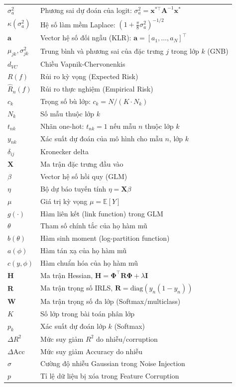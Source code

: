 \documentclass[oneside]{styles/hcmus-report}
\begin{document}
\begin{longtable}{p{} p{}}
$\sigma_a^2$            & Phương sai dự đoán của logit: $\sigma_a^2 = \mathbf{x}^{*\top}\mathbf{A}^{-1}\mathbf{x}^*$ \\
$\kappa(\sigma_a^2)$    & Hệ số làm mềm Laplace: $(1+\frac{\pi}{8}\sigma_a^2)^{-1/2}$ \\
$\mathbf{a}$            & Vector hệ số đối ngẫu (KLR): $\mathbf{a}=[a_1,\ldots,a_N]^\top$ \\
$\mu_{jk}, \sigma_{jk}^2$ & Trung bình và phương sai của đặc trưng $j$ trong lớp $k$ (GNB) \\
$d_{VC}$                & Chiều Vapnik-Chervonenkis \\
$R(f)$                  & Rủi ro kỳ vọng (Expected Risk) \\
$\hat{R}_n(f)$          & Rủi ro thực nghiệm (Empirical Risk) \\
$c_k$                   & Trọng số bù lớp: $c_k = N/(K \cdot N_k)$ \\
$N_k$                   & Số mẫu thuộc lớp $k$ \\
$t_{nk}$                & Nhãn one-hot: $t_{nk}=1$ nếu mẫu $n$ thuộc lớp $k$ \\
$y_{nk}$                & Xác suất dự đoán của mô hình cho mẫu $n$, lớp $k$ \\
$\delta_{ij}$           & Kronecker delta \\

$\mathbf{X}$ & Ma trận đặc trưng đầu vào \\
$\beta$ & Vector hệ số hồi quy (GLM) \\
$\eta$ & Bộ dự báo tuyến tính $\eta = \mathbf{X}\beta$ \\
$\mu$ & Giá trị kỳ vọng $\mu = \mathbb{E}[Y]$ \\
$g(\cdot)$ & Hàm liên kết (link function) trong GLM \\
$\theta$ & Tham số chính tắc của họ hàm mũ \\
$b(\theta)$ & Hàm sinh moment (log-partition function) \\
$a(\phi)$ & Hàm tán xạ của họ hàm mũ \\
$c(y,\phi)$ & Hàm chuẩn hóa của họ hàm mũ \\
$\mathbf{H}$ & Ma trận Hessian, $\mathbf{H} = \boldsymbol{\Phi}^\top\mathbf{R}\boldsymbol{\Phi} + \lambda\mathbf{I}$ \\
$\mathbf{R}$ & Ma trận trọng số IRLS, $\mathbf{R} = \mathrm{diag}(y_n(1-y_n))$ \\
$\mathbf{W}$ & Ma trận trọng số đa lớp (Softmax/multiclass) \\
$K$ & Số lớp trong bài toán phân lớp \\
$p_k$ & Xác suất dự đoán lớp $k$ (Softmax) \\
$\Delta R^2$ & Mức suy giảm $R^2$ do nhiễu/corruption \\
$\Delta\text{Acc}$ & Mức suy giảm Accuracy do nhiễu \\
$\sigma$ & Cường độ nhiễu Gaussian trong Noise Injection \\
$p$ & Tỉ lệ dữ liệu bị xóa trong Feature Corruption \\


\end{longtable}
\end{document}
